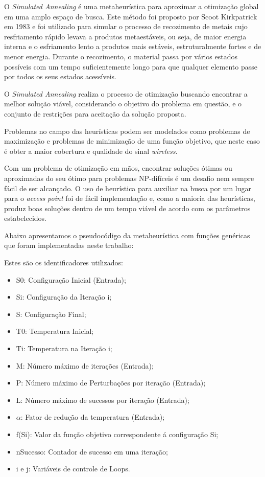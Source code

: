 \documentclass[
	12pt,				%
	openright,			%
	twoside,			%
	a4paper,			%
	english,			%
	french,				%
	spanish,			%
	brazil				%
	]{abntex2}
\begin{document}
O \textit{Simulated Annealing} é uma metaheurística para aproximar a otimização global em uma amplo espaço de busca. Este método foi proposto por Scoot Kirkpatrick em 1983 e foi utilizado para simular o processo de recozimento de metais cujo resfriamento  rápido levava a produtos metaestáveis, ou seja, de maior energia interna e o esfriamento lento a produtos mais estáveis, estruturalmente fortes e de menor energia. Durante o recozimento, o material passa por vários estados possíveis com um tempo suficientemente longo para que qualquer elemento passe por todos os seus estados acessíveis.

O \textit{Simulated Annealing} realiza o processo de otimização buscando encontrar a melhor solução viável, considerando o objetivo do problema em questão, e o conjunto de restrições para aceitação da solução proposta.

Problemas no campo das heurísticas podem ser modelados como problemas de maximização e problemas de minimização de uma função objetivo, que neste caso é obter a maior cobertura e qualidade do sinal \textit{wireless}.

Com um problema de otimização em mãos, encontrar soluções ótimas ou aproximadas do seu ótimo para problemas NP-difíceis é um desafio nem sempre fácil de ser alcançado. O uso de heurística para auxiliar na busca por um lugar para o \textit{access point} foi de fácil implementação e, como a maioria das heurísticas, produz boas soluções dentro de um tempo viável de acordo com os parâmetros estabelecidos.

Abaixo apresentamos o pseudocódigo da metaheurística com funções genéricas que foram implementadas neste trabalho:



Estes são os identificadores utilizados:

\begin{itemize}
	\item S0: Configuração Inicial (Entrada);
	\item Si: Configuração da Iteração i;
	\item S: Configuração Final;
	\item T0: Temperatura Inicial;
	\item Ti: Temperatura na Iteração i;
	\item M: Número máximo de iterações (Entrada);
	\item P: Número máximo de Perturbações por iteração (Entrada);
	\item L: Número máximo de sucessos por iteração (Entrada);
	\item $ \alpha $: Fator de redução da temperatura (Entrada);
	\item f(Si): Valor da função objetivo correspondente á configuração Si;
	\item nSucesso: Contador de sucesso em uma iteração;
	\item i e j: Variáveis de controle de Loops.
\end{itemize}
\end{document}
